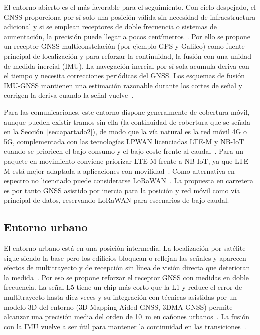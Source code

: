 \documentclass[11pt,a4paper]{article}
\begin{document}
El entorno abierto es el más favorable para el seguimiento. Con cielo despejado, el GNSS proporciona por sí solo una posición válida sin necesidad de infraestructura adicional y si se emplean receptores de doble frecuencia o sistemas de aumentación, la precisión puede llegar a pocos centímetros~\cite{ref8}. Por ello se propone un receptor GNSS multiconstelación (por ejemplo GPS y Galileo) como fuente principal de localización y para reforzar la continuidad, la fusión con una unidad de medida inercial (IMU). La navegación inercial por sí sola acumula deriva con el tiempo y necesita correcciones periódicas del GNSS. Los esquemas de fusión IMU-GNSS mantienen una estimación razonable durante los cortes de señal y corrigen la deriva cuando la señal vuelve~\cite{ref14}.

Para las comunicaciones, este entorno dispone generalmente de cobertura móvil, aunque pueden existir tramos sin ella (la continuidad de cobertura que se señala en la Sección~\ref{sec:apartado2}), de modo que la vía natural es la red móvil 4G o 5G, complementada con las tecnologías LPWAN licenciadas LTE-M y NB-IoT cuando se prioricen el bajo consumo y el bajo coste frente al caudal~\cite{ref12}. Para un paquete en movimiento conviene priorizar LTE-M frente a NB-IoT, ya que LTE-M está mejor adaptada a aplicaciones con movilidad~\cite{ref15}. Como alternativa en espectro no licenciado puede considerarse LoRaWAN~\cite{ref13}. La propuesta en carretera es por tanto GNSS asistido por inercia para la posición y red móvil como vía principal de datos, reservando LoRaWAN para escenarios de bajo caudal.

\subsection{Entorno urbano}
\label{sec:apartado3_3}

El entorno urbano está en una posición intermedia. La localización por satélite sigue siendo la base pero los edificios bloquean o reflejan las señales y aparecen efectos de multitrayecto y de recepción sin línea de visión directa que deterioran la medida~\cite{ref2,ref8}. Por eso se propone reforzar el receptor GNSS con medidas en doble frecuencia. La señal L5 tiene un chip más corto que la L1 y reduce el error de multitrayecto hasta diez veces y su integración con técnicas asistidas por un modelo 3D del entorno (3D Mapping-Aided GNSS, 3DMA GNSS) permite alcanzar una precisión media del orden de 10~m en cañones urbanos~\cite{ref16}. La fusión con la IMU vuelve a ser útil para mantener la continuidad en las transiciones~\cite{ref14}.
\end{document}
